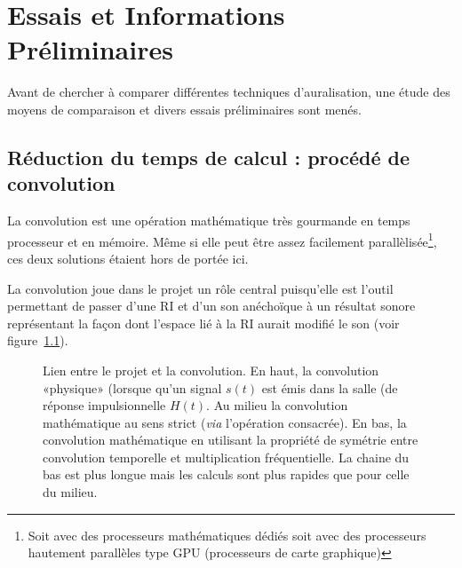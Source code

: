\chapter{Essais et Informations Préliminaires}

Avant de chercher à comparer différentes techniques d'auralisation, une étude des moyens de comparaison et divers
essais préliminaires sont menés.

%

\section{Réduction du temps de calcul : procédé de convolution} %
\label{acceleration_des_calculs}

La convolution est une opération mathématique très gourmande en temps processeur et en mémoire. Même si elle peut être
assez facilement parallèlisée\footnote{Soit avec des processeurs mathématiques dédiés soit avec des processeurs
hautement parallèles type GPU (processeurs de carte graphique)}, ces deux solutions étaient hors de portée ici.

La convolution joue dans le projet un rôle central puisqu'elle est l'outil permettant de passer d'une RI et d'un son
anéchoïque à un résultat sonore représentant la façon dont l'espace lié à la RI aurait modifié le son (voir
figure~\ref{lien_convo_projet}).

\begin{figure}[h!]
\caption{\label{lien_convo_projet}Lien entre le projet et la convolution. En haut, la convolution «physique» (lorsque
qu'un signal $s(t)$ est émis dans la salle (de réponse impulsionnelle $H(t)$. Au milieu la convolution mathématique au
sens strict (\textit{via} l'opération consacrée). En bas, la convolution mathématique en utilisant la propriété de
symétrie entre convolution temporelle et multiplication fréquentielle. La chaine du bas est plus longue mais les calculs
sont plus rapides que pour celle du milieu.}
\end{figure}

